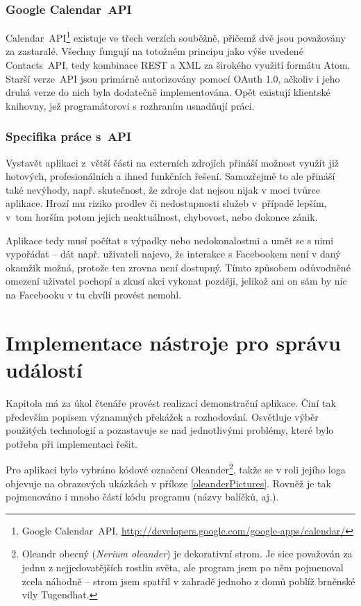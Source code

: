 \documentclass[12pt,oneside,final]{fithesis2}
\begin{document}
\subsection{Google Calendar~API}
Calendar~API\footnote{Google Calendar~API, \url{http://developers.google.com/google-apps/calendar/}} existuje ve třech verzích souběžně, přičemž dvě jsou považovány za zastaralé. Všechny fungují na totožném principu jako výše uvedené Contacts~API, tedy kombinace REST a XML za širokého využití formátu Atom. Starší verze~API jsou primárně autorizovány pomocí OAuth 1.0, ačkoliv i jeho druhá verze do nich byla dodatečně implementována. Opět existují klientské knihovny, jež programátorovi s rozhraním usnadňují práci.

\subsection{Specifika práce s~API}
Vystavět aplikaci z~větší části na externích zdrojích přináší možnost využít již hotových, profesionálních a ihned funkčních řešení. Samozřejmě to ale přináší také nevýhody, např. skutečnost, že zdroje dat nejsou nijak v moci tvůrce aplikace. Hrozí mu riziko prodlev či nedostupnosti služeb v~případě lepším, v~tom horším potom jejich neaktuálnost, chybovost, nebo dokonce zánik.

Aplikace tedy musí počítat s výpadky nebo nedokonalostmi a umět se s nimi vypořádat -- dát např. uživateli najevo, že interakce s Facebookem není v daný okamžik možná, protože ten zrovna není dostupný. Tímto způsobem odůvodněné omezení uživatel pochopí a zkusí akci vykonat později, jelikož ani on sám by nic na Facebooku v tu chvíli provést nemohl.


\chapter{Implementace nástroje pro správu událostí}
Kapitola má za úkol čtenáře provést realizací demonstrační aplikace. Činí tak především popisem významných překážek a rozhodování. Osvětluje výběr použitých technologií a pozastavuje se nad jednotlivými problémy, které bylo potřeba při implementaci řešit.

Pro aplikaci bylo vybráno kódové označení Oleander\footnote{Oleandr obecný (\emph{Nerium oleander}) je dekorativní strom. Je sice považován za jednu z nejjedovatějších rostlin světa, ale program jsem po něm pojmenoval zcela náhodně -- strom jsem spatřil v zahradě jednoho z domů poblíž brněnské vily Tugendhat.}, takže se v roli jejího loga objevuje na obrazových ukázkách v příloze \ref{oleanderPictures}. Rovněž je tak pojmenováno i mnoho částí kódu programu (názvy balíčků, aj.).
\end{document}
